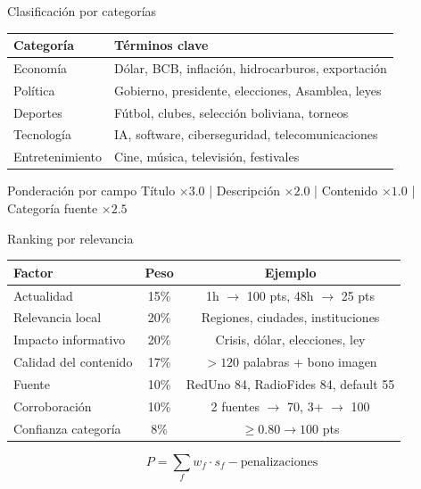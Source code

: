 \documentclass[10pt,xcolor={dvipsnames}]{beamer}
\begin{document}
\begin{frame}{Clasificación por categorías}

\centering
\begin{tabular}{ll}
\toprule
\textbf{Categoría} & \textbf{Términos clave} \\
\midrule
Economía & Dólar, BCB, inflación, hidrocarburos, exportación \\
\midrule
Política & Gobierno, presidente, elecciones, Asamblea, leyes \\
\midrule
Deportes & Fútbol, clubes, selección boliviana, torneos \\
\midrule
Tecnología & IA, software, ciberseguridad, telecomunicaciones \\
\midrule
Entretenimiento & Cine, música, televisión, festivales \\
\bottomrule
\end{tabular}

\vspace{0.4cm}
\begin{block}{Ponderación por campo}
Título $\times 3.0$ \;|\; Descripción $\times 2.0$ \;|\; Contenido $\times 1.0$ \;|\; Categoría fuente $\times 2.5$
\end{block}
\end{frame}

\begin{frame}{Ranking por relevancia}

\begin{table}[H]
\centering
\small
\begin{tabular}{lcc}
\toprule
\textbf{Factor} & \textbf{Peso} & \textbf{Ejemplo} \\
\midrule
Actualidad & 15\% & 1h $\to$ 100 pts, 48h $\to$ 25 pts \\
Relevancia local & 20\% & Regiones, ciudades, instituciones \\
Impacto informativo & 20\% & Crisis, dólar, elecciones, ley \\
Calidad del contenido & 17\% & $>120$ palabras + bono imagen \\
Fuente & 10\% & RedUno 84, RadioFides 84, default 55 \\
Corroboración & 10\% & 2 fuentes $\to$ 70, 3+ $\to$ 100 \\
Confianza categoría & 8\% & $\ge 0.80 \to 100$ pts \\
\bottomrule
\end{tabular}
\end{table}

\[
P = \sum_{f} w_f \cdot s_f - \text{penalizaciones}
\]
\end{frame}
\end{document}
